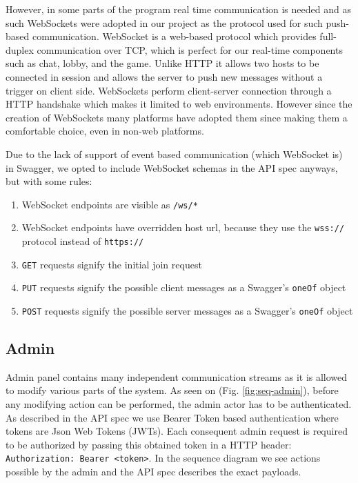 \documentclass[titlepage]{article}
\newcommand{\figref}[1]{{(Fig. \hypersetup{linkcolor=blue}\ref{#1})}}
\begin{document}
However, in some parts of the program real time communication is needed and as such WebSockets were adopted in our project as the protocol used for such push-based communication. WebSocket is a web-based protocol which provides full-duplex communication over TCP, which is perfect for our real-time components such as chat, lobby, and the game. Unlike HTTP it allows two hosts to be connected in session and allows the server to push new messages without a trigger on client side. WebSockets perform client-server connection through a HTTP handshake which makes it limited to web environments. However since the creation of WebSockets many platforms have adopted them since making them a comfortable choice, even in non-web platforms.

Due to the lack of support of event based communication (which WebSocket is) in Swagger, we opted to include WebSocket schemas in the API spec anyways, but with some rules:

\begin{enumerate}
	\item WebSocket endpoints are visible as \texttt{/ws/*}
	\item WebSocket endpoints have overridden host url, because they use the \texttt{wss://} protocol instead of \texttt{https://}
	\item \texttt{GET} requests signify the initial join request
	\item \texttt{PUT} requests signify the possible client messages as a Swagger's \texttt{oneOf} object
	\item \texttt{POST} requests signify the possible server messages as a Swagger's \texttt{oneOf} object
\end{enumerate}

\subsection{Admin}

Admin panel contains many independent communication streams as it is allowed to modify various parts of the system. As seen on \figref{fig:seq-admin}, before any modifying action can be performed, the admin actor has to be authenticated. As described in the API spec we use Bearer Token based authentication where tokens are Json Web Tokens (JWTs). Each consequent admin request is required to be authorized by passing this obtained token in a HTTP header: \texttt{Authorization: Bearer <token>}. In the sequence diagram we see actions possible by the admin and the API spec describes the exact payloads.
\end{document}
